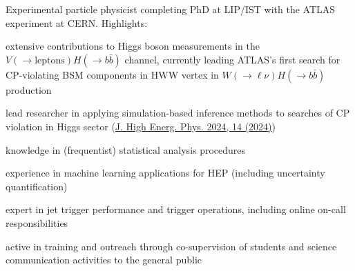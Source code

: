 
Experimental particle physicist completing PhD at LIP/IST with the ATLAS experiment at CERN. Highlights:

\begin{cvitems}
    \item[]\vspace{-0.5\baselineskip}
    \item extensive contributions to Higgs boson measurements in the $V(\to \textrm{leptons}) H(\to b\bar{b})$ channel, currently leading ATLAS's first search for CP-violating BSM components in HWW vertex in $W(\to \ell \nu) H(\to b\bar{b})$ production
    \item lead researcher in applying simulation-based inference methods to searches of CP violation in Higgs sector (\href{https://doi.org/10.1007/JHEP04(2024)014}{J. High Energ. Phys. 2024, 14 (2024)})
    \item knowledge in (frequentist) statistical analysis procedures
    \item experience in machine learning applications for HEP (including uncertainty quantification)
    \item expert in jet trigger performance and trigger operations, including online on-call responsibilities
    \item active in training and outreach through co-supervision of students and science communication activities to the general public
    \item[]\vspace{-0.5\baselineskip}
\end{cvitems}